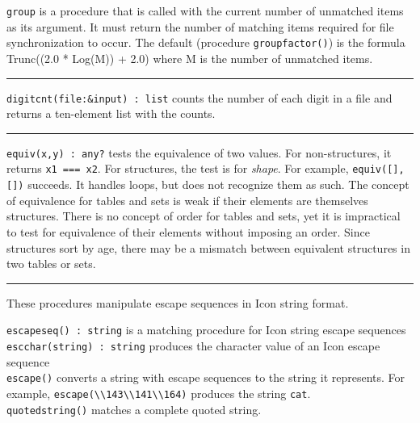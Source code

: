 \texttt{group} is a procedure that is called with the current number of
unmatched items as its argument. It must return the number of matching
items required for file synchronization to occur. The default
(procedure \texttt{groupfactor()}) is the formula Trunc((2.0 * Log(M))
+ 2.0) where M is the number of unmatched items.

\vspace{0.25cm}\hrule{}

\texttt{digitcnt(file:\&input) : list} counts the number of each digit
in a file and returns a ten-element list with the counts. 



\vspace{0.25cm}\hrule{}

\texttt{equiv(x,y) : any?} tests the equivalence of two values. For
non-structures, it returns \texttt{x1 === x2}. For structures, the test
is for \textit{shape}. For example,
\texttt{equiv([],[])} succeeds. It handles loops, but does not
recognize them as such. The concept of equivalence for tables and sets
is weak if their elements are themselves structures. There
is no concept of order for tables and sets, yet it is impractical to
test for equivalence of their elements without imposing an order. Since
structures sort by {\textquotedbl}age{\textquotedbl}, there may be a
mismatch between equivalent structures in two tables or sets. 

\vspace{0.25cm}\hrule{}

These procedures manipulate escape sequences in
Icon string format.

\texttt{escapeseq() : string} is a matching procedure for Icon string
escape sequences\\
\texttt{escchar(string) : string} produces the character value of an
Icon escape sequence\\
\texttt{escape()} converts a string with escape sequences to the string it
represents. For example,
\texttt{escape({\textquotedbl}{\textbackslash}{\textbackslash}143{\textbackslash}{\textbackslash}141{\textbackslash}{\textbackslash}164{\textquotedbl})}
produces the string \texttt{{\textquotedbl}cat{\textquotedbl}}.\\
\texttt{quotedstring()} matches a complete quoted string.

